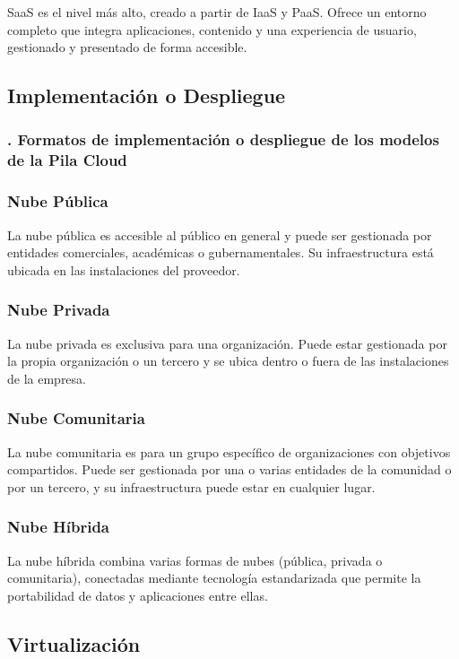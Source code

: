 \documentclass{article}
\begin{document}
SaaS es el nivel más alto, creado a partir de IaaS y PaaS. Ofrece un entorno completo que integra aplicaciones, contenido y una experiencia de usuario, gestionado y presentado de forma accesible.

\subsection{Implementación o Despliegue}
\subsubsection{. Formatos de implementación o despliegue de los modelos de la Pila Cloud}

\subsubsection*{Nube Pública}
La nube pública es accesible al público en general y puede ser gestionada por entidades comerciales, académicas o gubernamentales. Su infraestructura está ubicada en las instalaciones del proveedor.

\subsubsection*{Nube Privada}
La nube privada es exclusiva para una organización. Puede estar gestionada por la propia organización o un tercero y se ubica dentro o fuera de las instalaciones de la empresa.

\subsubsection*{Nube Comunitaria}
La nube comunitaria es para un grupo específico de organizaciones con objetivos compartidos. Puede ser gestionada por una o varias entidades de la comunidad o por un tercero, y su infraestructura puede estar en cualquier lugar.

\subsubsection*{Nube Híbrida}
La nube híbrida combina varias formas de nubes (pública, privada o comunitaria), conectadas mediante tecnología estandarizada que permite la portabilidad de datos y aplicaciones entre ellas.

\subsection{Virtualización}
\end{document}
